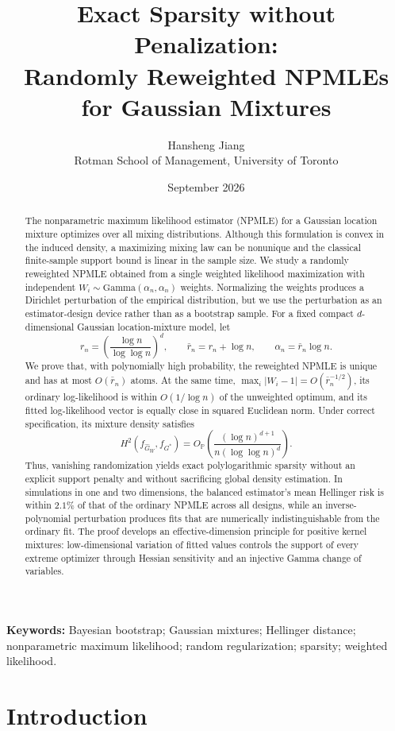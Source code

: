 \documentclass[11pt]{article}
\title{\bfseries Exact Sparsity without Penalization:\\
Randomly Reweighted NPMLEs for Gaussian Mixtures}
\author{Hansheng Jiang\\[-0.2em]
\small Rotman School of Management, University of Toronto}
\date{September 2026}
\theoremstyle{definition}
\theoremstyle{remark}
\newcommand{\PP}{\mathbb P}
\newcommand{\abs}[1]{\lvert #1\rvert}
\newcommand{\Ghat}{\widehat G}
\begin{document}
\maketitle

\begin{abstract}
The nonparametric maximum likelihood estimator (NPMLE) for a Gaussian
location mixture optimizes over all mixing distributions.  Although this
formulation is convex in the induced density, a maximizing mixing law can be
nonunique and the classical finite-sample support bound is linear in the
sample size.  We study a randomly reweighted NPMLE obtained from a single
weighted likelihood maximization with independent
$W_i\sim\mathrm{Gamma}(\alpha_n,\alpha_n)$ weights.  Normalizing the weights
produces a Dirichlet perturbation of the empirical distribution, but we use
the perturbation as an estimator-design device rather than as a bootstrap
sample.  For a fixed compact $d$-dimensional Gaussian location-mixture model,
let
\[
 r_n=\left(\frac{\log n}{\log\log n}\right)^d,
 \qquad \bar r_n=r_n+\log n,
 \qquad \alpha_n=\bar r_n\log n.
\]
We prove that, with polynomially high probability, the reweighted NPMLE is
unique and has at most $O(\bar r_n)$ atoms.  At the same time,
$\max_i\abs{W_i-1}=O(\bar r_n^{-1/2})$, its ordinary log-likelihood is within
$O(1/\log n)$ of the unweighted optimum, and its fitted log-likelihood vector
is equally close in squared Euclidean norm.  Under correct specification, its
mixture density satisfies
\[
 H^2(f_{\Ghat_W},f_{G^*})
 =O_{\PP}\!\left(\frac{(\log n)^{d+1}}
 {n(\log\log n)^d}\right).
\]
Thus, vanishing randomization yields exact polylogarithmic sparsity without
an explicit support penalty and without sacrificing global density
estimation.  In simulations in one and two dimensions, the balanced
estimator's mean Hellinger risk is within $2.1\%$ of that of the ordinary
NPMLE across all designs, while an inverse-polynomial perturbation produces
fits that are numerically indistinguishable from the ordinary fit.  The proof
develops an effective-dimension principle for positive kernel mixtures:
low-dimensional variation of fitted values controls the support of every
extreme optimizer through Hessian sensitivity and an injective Gamma change
of variables.
\end{abstract}

\noindent\textbf{Keywords:} Bayesian bootstrap; Gaussian mixtures; Hellinger
distance; nonparametric maximum likelihood; random regularization; sparsity;
weighted likelihood.

\section{Introduction}\label{sec:introduction}
\end{document}
